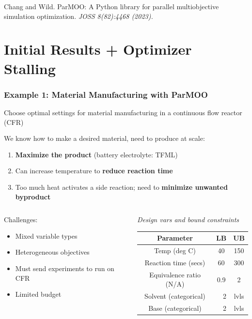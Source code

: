 \documentclass[aspectratio=169]{beamer}
\begin{document}
\begin{frame}
\bigskip
\bigskip

{\tiny
Chang and Wild.
ParMOO: A Python library for parallel multiobjective simulation optimization.
{\sl JOSS 8(82):4468 (2023).}
}

\end{frame}

\section{Initial Results + Optimizer Stalling}

\begin{frame}\frametitle{Example 1: Material Manufacturing with ParMOO}
Choose optimal settings for material manufacturing in a
continuous flow reactor (CFR)

\bigskip

We know how to make a desired material, need to produce at scale:

\begin{enumerate}
\item {\color{green} \bf Maximize the product} (battery electrolyte: TFML)
\item Can increase temperature to {\bf \color{red} reduce reaction time}
\item Too much heat activates a side reaction; need to
{\bf \color{blue} minimize unwanted byproduct}
\end{enumerate}

\bigskip
\begin{columns}
\begin{column}{0.5\textwidth}
Challenges:

\begin{itemize}
\item Mixed variable types
\item Heterogeneous objectives
\item Must send experiments to run on CFR
\item Limited budget
\end{itemize}
\end{column}
\begin{column}{0.5\textwidth}
  {\small
  {\sl Design vars and bound constraints}

  \smallskip

      \begin{tabular}{c|cc}
      Parameter & LB & UB \\
      \hline
       Temp (deg C) & 40 & 150 \\
       Reaction time (secs) & 60 & 300 \\
       Equivalence ratio (N/A) & 0.9 & 2 \\
      \hline
       Solvent (categorical) & $\quad$2 & lvls \\
       Base (categorical) & $\quad$2 & lvls \\
  \end{tabular}
  }
\end{column}
\end{columns}
\end{frame}
\end{document}
